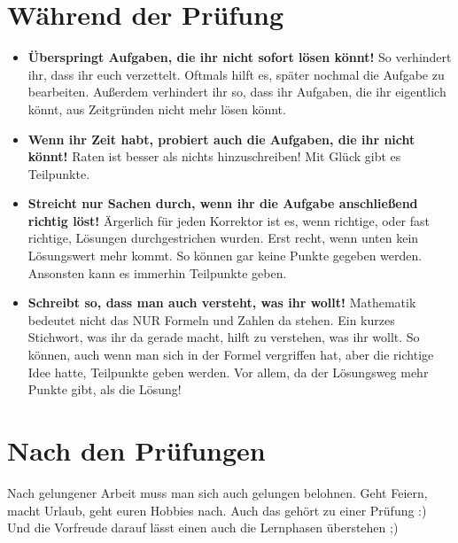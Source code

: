 	\section{Während der Prüfung}
		\begin{itemize}
		  \item \textbf{Überspringt Aufgaben, die ihr nicht sofort lösen könnt!} So
		  verhindert ihr, dass ihr euch verzettelt. Oftmals hilft es, später nochmal
		  die Aufgabe zu bearbeiten. Außerdem verhindert ihr so, dass ihr Aufgaben,
		  die ihr eigentlich könnt, aus Zeitgründen nicht mehr lösen könnt.
		  \item \textbf{Wenn ihr Zeit habt, probiert auch die Aufgaben, die ihr nicht
		  könnt!} Raten ist besser als nichts hinzuschreiben! Mit Glück gibt es
		  Teilpunkte.
		  \item \textbf{Streicht nur Sachen durch, wenn ihr die Aufgabe anschließend
		  richtig löst!} Ärgerlich für jeden Korrektor ist es, wenn richtige, oder
		  fast richtige, Lösungen durchgestrichen wurden. Erst recht, wenn unten kein
		  Lösungswert mehr kommt. So können gar keine Punkte gegeben werden. Ansonsten
		  kann es immerhin Teilpunkte geben.
		  \item \textbf{Schreibt so, dass man auch versteht, was ihr wollt!}
		  Mathematik bedeutet nicht das NUR Formeln und Zahlen da stehen. Ein kurzes
		  Stichwort, was ihr da gerade macht, hilft zu verstehen, was ihr wollt. So
		  können, auch wenn man sich in der Formel vergriffen hat, aber die richtige Idee hatte,
		  Teilpunkte geben werden. Vor allem, da der Lösungsweg mehr Punkte gibt, als
		  die Lösung!
		\end{itemize}
		
	\section{Nach den Prüfungen}
		Nach gelungener Arbeit muss man sich auch gelungen belohnen. Geht Feiern,
		macht Urlaub, geht euren Hobbies nach. Auch das gehört zu einer Prüfung :) Und
		die Vorfreude darauf lässt einen auch die Lernphasen überstehen ;)
